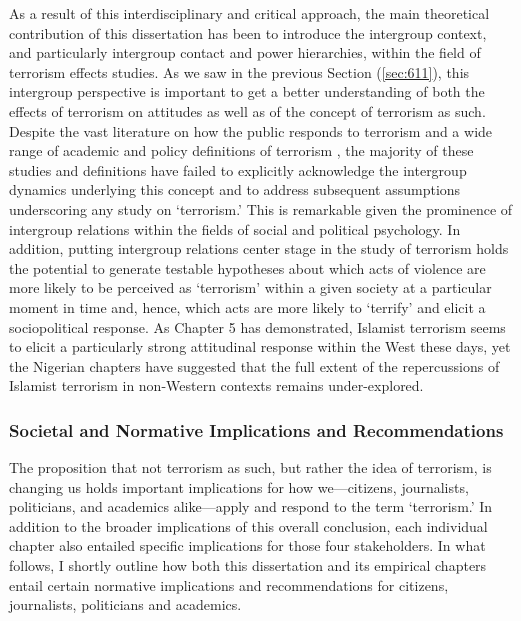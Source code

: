 As a result of this interdisciplinary and critical approach, the main theoretical contribution of this dissertation has been to introduce the intergroup context, and particularly intergroup contact and power hierarchies, within the field of terrorism effects studies. As we saw in the previous Section (\ref{sec:611}), this intergroup perspective is important to get a better understanding of both the effects of terrorism on attitudes as well as of the concept of terrorism as such. Despite the vast literature on how the public responds to terrorism \citep[e.g.,][]{Gadarian2010c, Davis2004, Vasilopoulos2019c, Larsen2020} and a wide range of academic and policy definitions of terrorism \citep{Richards2014, Schmid2011, US2019}, the majority of these studies and definitions have failed to explicitly acknowledge the intergroup dynamics underlying this concept and to address subsequent assumptions underscoring any study on `terrorism.' This is remarkable given the prominence of intergroup relations within the fields of social and political psychology. In addition, putting intergroup relations center stage in the study of terrorism holds the potential to generate testable hypotheses about which acts of violence are more likely to be perceived as `terrorism' within a given society at a particular moment in time and, hence, which acts are more likely to `terrify' and elicit a sociopolitical response. As Chapter 5 has demonstrated, Islamist terrorism seems to elicit a particularly strong attitudinal response within the West these days, yet the Nigerian chapters have suggested that the full extent of the repercussions of Islamist terrorism in non-Western contexts remains under-explored. 


\subsubsection{Societal and Normative Implications and Recommendations}
The proposition that not terrorism as such, but rather the idea of terrorism, is changing us holds important implications for how we---citizens, journalists, politicians, and academics alike---apply and respond to the term `terrorism.' In addition to the broader implications of this overall conclusion, each individual chapter also entailed specific implications for those four stakeholders. In what follows, I shortly outline how both this dissertation and its empirical chapters entail certain normative implications and recommendations for citizens, journalists, politicians and academics.


